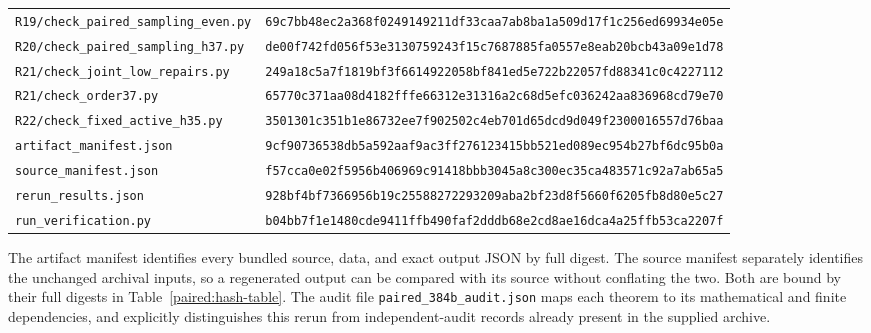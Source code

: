 \documentclass[11pt,a4paper]{article}
\theoremstyle{definition}\newtheorem{definition}[theorem]{Definition}
\theoremstyle{remark}\newtheorem{remark}[theorem]{Remark}
\begin{document}
\begin{longtable}{p{}p{}}
\nolinkurl{R19/check_paired_sampling_even.py} & \texttt{69c7bb48ec2a368f0249149211df33ca}\newline\texttt{a7ab8ba1a509d17f1c256ed69934e05e}\\[3pt]
\nolinkurl{R20/check_paired_sampling_h37.py} & \texttt{de00f742fd056f53e3130759243f15c7}\newline\texttt{687885fa0557e8eab20bcb43a09e1d78}\\[3pt]
\nolinkurl{R21/check_joint_low_repairs.py} & \texttt{249a18c5a7f1819bf3f6614922058bf8}\newline\texttt{41ed5e722b22057fd88341c0c4227112}\\[3pt]
\nolinkurl{R21/check_order37.py} & \texttt{65770c371aa08d4182fffe66312e3131}\newline\texttt{6a2c68d5efc036242aa836968cd79e70}\\[3pt]
\nolinkurl{R22/check_fixed_active_h35.py} & \texttt{3501301c351b1e86732ee7f902502c4e}\newline\texttt{b701d65dcd9d049f2300016557d76baa}\\[3pt]
\nolinkurl{artifact_manifest.json} & \texttt{9cf90736538db5a592aaf9ac3ff27612}\newline\texttt{3415bb521ed089ec954b27bf6dc95b0a}\\[3pt]
\nolinkurl{source_manifest.json} & \texttt{f57cca0e02f5956b406969c91418bbb3}\newline\texttt{045a8c300ec35ca483571c92a7ab65a5}\\[3pt]
\nolinkurl{rerun_results.json} & \texttt{928bf4bf7366956b19c2558827229320}\newline\texttt{9aba2bf23d8f5660f6205fb8d80e5c27}\\[3pt]
\nolinkurl{run_verification.py} & \texttt{b04bb7f1e1480cde9411ffb490faf2dd}\newline\texttt{db68e2cd8ae16dca4a25ffb53ca2207f}\\[3pt]
\end{longtable}
\endgroup

The artifact manifest identifies every bundled source, data, and exact
output JSON by full digest. The source manifest separately identifies
the unchanged archival inputs, so a regenerated output can be compared
with its source without conflating the two. Both are bound by their
full digests in Table~\ref{paired:hash-table}. The audit file
\nolinkurl{paired_384b_audit.json} maps each theorem to its mathematical
and finite dependencies, and explicitly distinguishes this rerun from
independent-audit records already present in the supplied archive.
\end{document}
